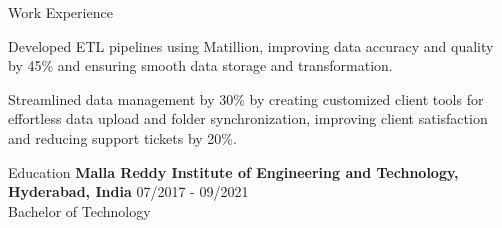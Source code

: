 \documentclass{resume} %
\begin{document}
\begin{rSection}{Work Experience}
\begin{rSubsection}
                                    \item Developed ETL pipelines using Matillion, improving data accuracy and quality by 45\% and ensuring smooth data storage and transformation.
                                    \item Streamlined data management by 30\% by creating customized client tools for effortless data upload and folder synchronization, improving client satisfaction and reducing support tickets by 20\%.
                            \end{rSubsection}
            \end{rSection}

\begin{rSection}{Education}
                        \textbf{Malla Reddy Institute of Engineering and Technology, Hyderabad, India} \hfill {07/2017 - 09/2021} \\
                            {Bachelor of Technology}
                         
             
         
    \end{rSection}
\end{document}
